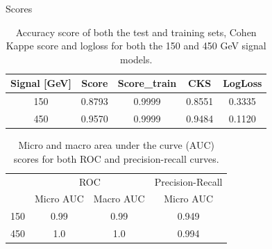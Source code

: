 \documentclass[notes]{beamer}
\begin{document}
	\begin{frame}[t]{Scores}
		\begin{table}[htb!]
			\centering
			\begin{tabular}{ |c|c|c|c|c| }
				\hline \rule{0pt}{13pt}
				Signal [GeV] & Score & Score\_train & CKS & LogLoss  \\
				\hline \rule{0pt}{13pt}
				150 & 0.8793 & 0.9999 & 0.8551 & 0.3335 \\
				\hline \rule{0pt}{13pt}
				450 & 0.9570 & 0.9999 & 0.9484 & 0.1120 \\
				\hline
			\end{tabular}	         
			\caption{Accuracy score of both the test and training sets, Cohen Kappe score and logloss for both the 150 and 450 GeV signal models.}
			\label{tab:Test}
		\end{table}
		\begin{table}[htb!]
			\centering
			\begin{tabular}{ |c|c|c|c| }
				\hline \rule{0pt}{13pt}
				\multirow{2}{*}{Signal [GeV]} & \multicolumn{2}{c|}{ROC} & \multicolumn{1}{c|}{Precision-Recall}\\
				\cline{2-4} \rule{0pt}{13pt}
				 & Micro AUC & Macro AUC & Micro AUC  \\
				\hline \rule{0pt}{13pt}
				150 & 0.99 & 0.99 & 0.949 \\
				\hline \rule{0pt}{13pt}
				450 & 1.0 & 1.0 & 0.994  \\
				\hline
			\end{tabular}	         
			\caption{Micro and macro area under the curve (AUC) scores for both ROC and precision-recall curves.}
			\label{tab:AUC}
		\end{table}
	\end{frame}
\end{document}
